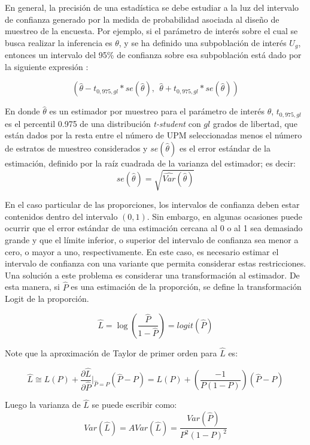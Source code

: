 \documentclass[12pt,spanish,]{book}
\begin{document}
En general, la precisión de una estadística se debe estudiar a la luz del intervalo de confianza generado por la medida de probabilidad asociada al diseño de muestreo de la encuesta. Por ejemplo, si el parámetro de interés sobre el cual se busca realizar la inferencia es \(\theta\), y se ha definido una subpoblación de interés \(U_g\), entonces un intervalo del 95\% de confianza sobre esa subpoblación está dado por la siguiente expresión \autocite{Heeringa_West_Berglund_2010}:

\[
(\hat\theta - t_{0,975, gl} * se(\hat\theta), \ \ \hat\theta + t_{0,975, gl} * se(\hat\theta))
\]

En donde \(\hat\theta\) es un estimador por muestreo para el parámetro de interés \(\theta\), \(t_{0,975, gl}\) es el percentil 0.975 de una distribución \emph{t-student} con \(gl\) grados de libertad, que están dados por la resta entre el número de UPM seleccionadas menos el número de estratos de muestreo considerados y \(se(\hat\theta)\) es el error estándar de la estimación, definido por la raíz cuadrada de la varianza del estimador; es decir:
\[
se(\hat\theta) = \sqrt{\widehat{Var}(\hat\theta)}
\]

En el caso particular de las proporciones, los intervalos de confianza deben estar contenidos dentro del intervalo \((0, 1)\). Sin embargo, en algunas ocasiones puede ocurrir que el error estándar de una estimación cercana al 0 o al 1 sea demasiado grande y que el límite inferior, o superior del intervalo de confianza sea menor a cero, o mayor a uno, respectivamente. En este caso, es necesario estimar el intervalo de confianza con una variante que permita considerar estas restricciones. Una solución a este problema es considerar una transformación al estimador. De esta manera, si \(\hat{P}\) es una estimación de la proporción, se define la transformación Logit de la proporción.

\begin{equation}
\label{L1}
\hat{L} = \log \left(\dfrac{\hat{P}}{1-\hat{P}} \right) = logit(\hat{P})
\end{equation}

Note que la aproximación de Taylor de primer orden para \(\hat{L}\) es:

\[
\hat{L} \cong L(P) + \frac{\partial \hat{L}}{\partial \hat{P}}\biggr\rvert_{\hat{P}=P}(\hat{P}-P) = L(P) + \left( \dfrac{-1}{P(1-P)}\right)(\hat{P}-P)
\]

Luego la varianza de \(\hat{L}\) se puede escribir como:
\[
Var(\hat{L}) = AVar(\hat{L}) = \dfrac{Var(\hat{P})}{P^2(1-P)^2}
\]
\end{document}

